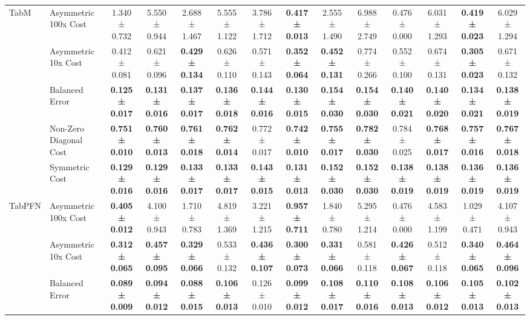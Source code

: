\begin{table}[H]
{\begin{tabular}{llcccccccccccc}
\cline{1-14}
\multirow[t]{5}{*}{TabM} & Asymmetric 100x Cost & 1.340 ± 0.732 & 5.550 ± 0.944 & 2.688 ± 1.467 & 5.555 ± 1.122 & 3.786 ± 1.712 & \textbf{0.417 ± 0.013} & 2.555 ± 1.490 & 6.988 ± 2.749 & 0.476 ± 0.000 & 6.031 ± 1.293 & \textbf{0.419 ± 0.023} & 6.029 ± 1.294 \\
 & Asymmetric 10x Cost & 0.412 ± 0.081 & 0.621 ± 0.096 & \textbf{0.429 ± 0.134} & 0.626 ± 0.110 & 0.571 ± 0.143 & \textbf{0.352 ± 0.064} & \textbf{0.452 ± 0.131} & 0.774 ± 0.266 & 0.552 ± 0.100 & 0.674 ± 0.131 & \textbf{0.305 ± 0.023} & 0.671 ± 0.132 \\
 & Balanced Error & \textbf{0.125 ± 0.017} & \textbf{0.131 ± 0.016} & \textbf{0.137 ± 0.017} & \textbf{0.136 ± 0.018} & \textbf{0.144 ± 0.016} & \textbf{0.130 ± 0.015} & \textbf{0.154 ± 0.030} & \textbf{0.154 ± 0.030} & \textbf{0.140 ± 0.021} & \textbf{0.140 ± 0.020} & \textbf{0.134 ± 0.021} & \textbf{0.138 ± 0.019} \\
 & Non-Zero Diagonal Cost & \textbf{0.751 ± 0.010} & \textbf{0.760 ± 0.013} & \textbf{0.761 ± 0.018} & \textbf{0.762 ± 0.014} & 0.772 ± 0.017 & \textbf{0.742 ± 0.010} & \textbf{0.755 ± 0.017} & \textbf{0.782 ± 0.030} & 0.784 ± 0.025 & \textbf{0.768 ± 0.017} & \textbf{0.757 ± 0.016} & \textbf{0.767 ± 0.018} \\
 & Symmetric Cost & \textbf{0.129 ± 0.016} & \textbf{0.129 ± 0.016} & \textbf{0.133 ± 0.017} & \textbf{0.133 ± 0.017} & \textbf{0.143 ± 0.015} & \textbf{0.131 ± 0.013} & \textbf{0.152 ± 0.030} & \textbf{0.152 ± 0.030} & \textbf{0.138 ± 0.019} & \textbf{0.138 ± 0.019} & \textbf{0.136 ± 0.019} & \textbf{0.136 ± 0.019} \\
\cline{1-14}
\multirow[t]{5}{*}{TabPFN} & Asymmetric 100x Cost & \textbf{0.405 ± 0.012} & 4.100 ± 0.943 & 1.710 ± 0.783 & 4.819 ± 1.369 & 3.221 ± 1.215 & \textbf{0.957 ± 0.711} & 1.840 ± 0.780 & 5.295 ± 1.214 & 0.476 ± 0.000 & 4.583 ± 1.199 & 1.029 ± 0.471 & 4.107 ± 0.943 \\
 & Asymmetric 10x Cost & \textbf{0.312 ± 0.065} & \textbf{0.457 ± 0.095} & \textbf{0.329 ± 0.066} & 0.533 ± 0.132 & \textbf{0.436 ± 0.107} & \textbf{0.300 ± 0.073} & \textbf{0.331 ± 0.066} & 0.581 ± 0.118 & \textbf{0.426 ± 0.067} & 0.512 ± 0.118 & \textbf{0.340 ± 0.065} & \textbf{0.464 ± 0.096} \\
 & Balanced Error & \textbf{0.089 ± 0.009} & \textbf{0.094 ± 0.012} & \textbf{0.088 ± 0.015} & \textbf{0.106 ± 0.013} & 0.126 ± 0.010 & \textbf{0.099 ± 0.012} & \textbf{0.108 ± 0.017} & \textbf{0.110 ± 0.016} & \textbf{0.108 ± 0.013} & \textbf{0.106 ± 0.012} & \textbf{0.105 ± 0.013} & \textbf{0.102 ± 0.013} \\

\end{tabular}}
\end{table}
